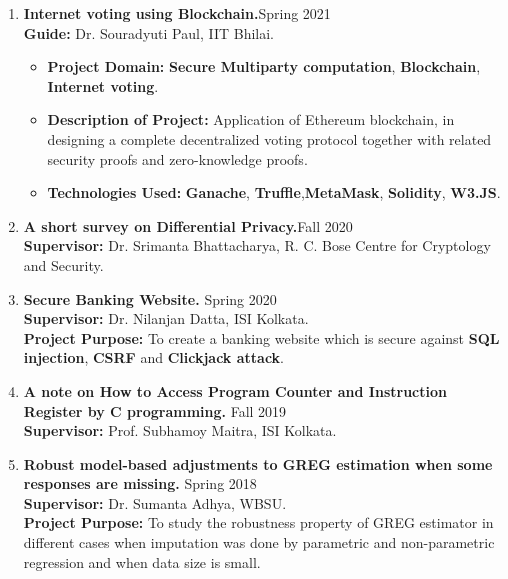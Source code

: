 \documentclass[margin,line]{res}
\begin{document}
\begin{resume}
\begin{enumerate}
\item
{\bf Internet voting using Blockchain.}\hfill{Spring 2021}\\
\textbf{Guide:} Dr. Souradyuti Paul, IIT Bhilai.

\begin{itemize}
\item
\textbf{Project Domain: }\textbf{Secure Multiparty computation},  \textbf{Blockchain}, \textbf{Internet voting}.
\item
\textbf{Description of Project: }Application of Ethereum blockchain, in designing a complete decentralized voting protocol together with related security proofs and zero-knowledge proofs.

\item
\textbf{Technologies Used:} \textbf{Ganache}, \textbf{Truffle},\textbf{MetaMask}, \textbf{Solidity}, \textbf{W3.JS}.
\end{itemize}


\item
{\bf A short survey on Differential Privacy.}\hfill{Fall 2020}\\
\textbf{Supervisor:} Dr. Srimanta Bhattacharya, R. C. Bose Centre for Cryptology and Security.\\



\item
{\bf Secure Banking Website. }\hfill{Spring 2020}\\
\textbf{Supervisor:} Dr. Nilanjan Datta, ISI Kolkata.\\
\textbf{Project Purpose:} To create a banking website which is secure against \textbf{SQL injection}, \textbf{CSRF} and \textbf{Clickjack attack}.


\item 
{\bf A note on How to Access Program Counter and Instruction Register by C programming. }\hfill{Fall 2019}\\
\textbf{Supervisor:} Prof. Subhamoy Maitra, ISI Kolkata.

\item
{\bf Robust model-based adjustments to GREG estimation when some responses are missing. }\hfill{Spring 2018}\\
\textbf{Supervisor:} Dr. Sumanta Adhya, WBSU.\\
\textbf{Project Purpose:} To study the robustness property of GREG estimator in different cases when imputation was done by parametric and non-parametric regression and when data size is small.


\end{enumerate}
\end{resume}
\end{document}
